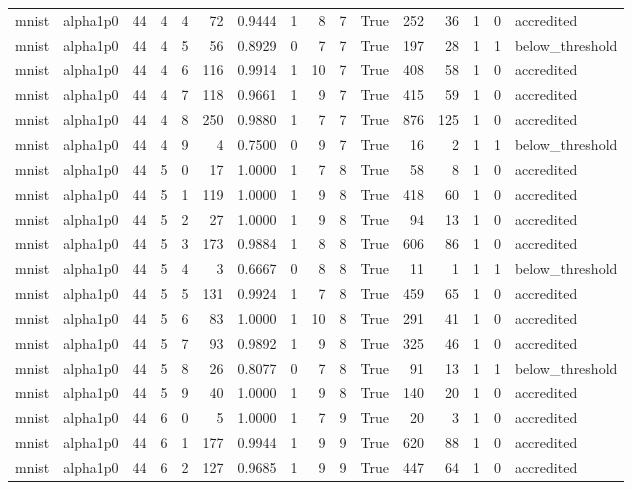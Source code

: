 \begin{tabular}{llrrrrrrrrrrrrrl}
mnist & alpha1p0 & 44 & 4 & 4 & 72 & 0.9444 & 1 & 8 & 7 & True & 252 & 36 & 1 & 0 & accredited \\
mnist & alpha1p0 & 44 & 4 & 5 & 56 & 0.8929 & 0 & 7 & 7 & True & 197 & 28 & 1 & 1 & below\_threshold \\
mnist & alpha1p0 & 44 & 4 & 6 & 116 & 0.9914 & 1 & 10 & 7 & True & 408 & 58 & 1 & 0 & accredited \\
mnist & alpha1p0 & 44 & 4 & 7 & 118 & 0.9661 & 1 & 9 & 7 & True & 415 & 59 & 1 & 0 & accredited \\
mnist & alpha1p0 & 44 & 4 & 8 & 250 & 0.9880 & 1 & 7 & 7 & True & 876 & 125 & 1 & 0 & accredited \\
mnist & alpha1p0 & 44 & 4 & 9 & 4 & 0.7500 & 0 & 9 & 7 & True & 16 & 2 & 1 & 1 & below\_threshold \\
mnist & alpha1p0 & 44 & 5 & 0 & 17 & 1.0000 & 1 & 7 & 8 & True & 58 & 8 & 1 & 0 & accredited \\
mnist & alpha1p0 & 44 & 5 & 1 & 119 & 1.0000 & 1 & 9 & 8 & True & 418 & 60 & 1 & 0 & accredited \\
mnist & alpha1p0 & 44 & 5 & 2 & 27 & 1.0000 & 1 & 9 & 8 & True & 94 & 13 & 1 & 0 & accredited \\
mnist & alpha1p0 & 44 & 5 & 3 & 173 & 0.9884 & 1 & 8 & 8 & True & 606 & 86 & 1 & 0 & accredited \\
mnist & alpha1p0 & 44 & 5 & 4 & 3 & 0.6667 & 0 & 8 & 8 & True & 11 & 1 & 1 & 1 & below\_threshold \\
mnist & alpha1p0 & 44 & 5 & 5 & 131 & 0.9924 & 1 & 7 & 8 & True & 459 & 65 & 1 & 0 & accredited \\
mnist & alpha1p0 & 44 & 5 & 6 & 83 & 1.0000 & 1 & 10 & 8 & True & 291 & 41 & 1 & 0 & accredited \\
mnist & alpha1p0 & 44 & 5 & 7 & 93 & 0.9892 & 1 & 9 & 8 & True & 325 & 46 & 1 & 0 & accredited \\
mnist & alpha1p0 & 44 & 5 & 8 & 26 & 0.8077 & 0 & 7 & 8 & True & 91 & 13 & 1 & 1 & below\_threshold \\
mnist & alpha1p0 & 44 & 5 & 9 & 40 & 1.0000 & 1 & 9 & 8 & True & 140 & 20 & 1 & 0 & accredited \\
mnist & alpha1p0 & 44 & 6 & 0 & 5 & 1.0000 & 1 & 7 & 9 & True & 20 & 3 & 1 & 0 & accredited \\
mnist & alpha1p0 & 44 & 6 & 1 & 177 & 0.9944 & 1 & 9 & 9 & True & 620 & 88 & 1 & 0 & accredited \\
mnist & alpha1p0 & 44 & 6 & 2 & 127 & 0.9685 & 1 & 9 & 9 & True & 447 & 64 & 1 & 0 & accredited \\

\end{tabular}
